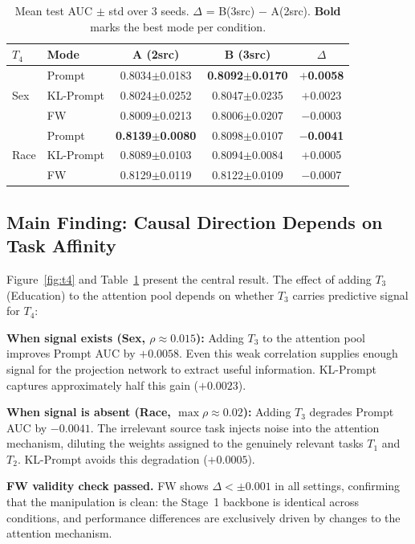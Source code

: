 \documentclass[sigconf,anonymous]{acmart}
\begin{document}
\begin{table}[t]
  \centering
  \caption{Mean test AUC $\pm$ std over 3 seeds. $\Delta$ = B(3src) $-$ A(2src).
           \textbf{Bold} marks the best mode per condition.}
  \label{tab:t4}
  \begin{tabular}{llccc}
    \toprule
    $T_4$ & Mode & A (2src) & B (3src) & $\Delta$ \\
    \midrule
    \multirow{3}{*}{Sex}
        & Prompt  & 0.8034$\pm$0.0183 & \textbf{0.8092}$\pm$\textbf{0.0170} & \textbf{$+$0.0058} \\
        & KL-Prompt & 0.8024$\pm$0.0252 & 0.8047$\pm$0.0235 & $+$0.0023 \\
        & FW      & 0.8009$\pm$0.0213 & 0.8006$\pm$0.0207 & $-$0.0003 \\
    \midrule
    \multirow{3}{*}{Race}
        & Prompt  & \textbf{0.8139}$\pm$\textbf{0.0080} & 0.8098$\pm$0.0107 & \textbf{$-$0.0041} \\
        & KL-Prompt & 0.8089$\pm$0.0103 & 0.8094$\pm$0.0084 & $+$0.0005 \\
        & FW      & 0.8129$\pm$0.0119 & 0.8122$\pm$0.0109 & $-$0.0007 \\
    \bottomrule
  \end{tabular}
\end{table}

\subsection{Main Finding: Causal Direction Depends on Task Affinity}

Figure~\ref{fig:t4} and Table~\ref{tab:t4} present the central result. The
effect of adding $T_3$ (Education) to the attention pool depends on whether
$T_3$ carries predictive signal for $T_4$:

\textbf{When signal exists (Sex, $\rho \approx 0.015$):} Adding $T_3$ to the
attention pool improves Prompt AUC by $+0.0058$. Even this weak correlation
supplies enough signal for the projection network to extract useful
information. KL-Prompt captures approximately half this gain ($+0.0023$).

\textbf{When signal is absent (Race, $\max\rho \approx 0.02$):} Adding $T_3$
degrades Prompt AUC by $-0.0041$. The irrelevant source task injects noise
into the attention mechanism, diluting the weights assigned to the genuinely
relevant tasks $T_1$ and $T_2$. KL-Prompt avoids this degradation ($+0.0005$).

\textbf{FW validity check passed.} FW shows $\Delta < \pm 0.001$ in all
settings, confirming that the manipulation is clean: the Stage~1 backbone is
identical across conditions, and performance differences are exclusively
driven by changes to the attention mechanism.
\end{document}
